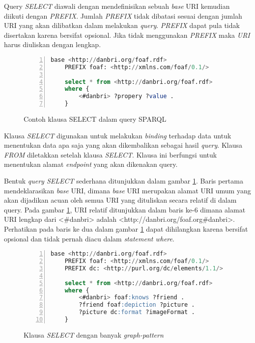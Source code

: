 Query \emph{SELECT} diawali dengan mendefinisikan sebuah \emph{base} URI kemudian diikuti dengan \emph{PREFIX}. Jumlah \emph{PREFIX} tidak dibatasi sesuai dengan jumlah URI yang akan dilibatkan dalam melakukan \emph{query}. \emph{PREFIX} dapat pula tidak disertakan karena bersifat opsional. Jika tidak menggunakan \emph{PREFIX} maka \emph{URI} harus diuliskan dengan lengkap.

\begin{figure}[hb]
	\centering
	\begin{lstlisting}[language=SQL, numbers=left]
	base <http://danbri.org/foaf.rdf>
	PREFIX foaf: <http://xmlns.com/foaf/0.1/>

	select * from <http://danbri.org/foaf.rdf>
	where {
		<#danbri> ?propery ?value .
	}\end{lstlisting}
	\caption{Contoh klausa SELECT dalam query SPARQL \citep{liyang_yu}}
	\label{fig:sparql_select_1}
\end{figure}

Klausa \emph{SELECT} digunakan untuk melakukan \emph{binding} terhadap data untuk menentukan data apa saja yang akan dikembalikan sebagai hasil \emph{query}. Klausa \emph{FROM} diletakkan setelah klausa \emph{SELECT}. Klausa ini berfungsi untuk menentukan alamat \emph{endpoint} yang akan dikenakan query.

Bentuk \emph{query SELECT} sederhana ditunjukkan dalam gambar \ref{fig:sparql_select_1}. Baris pertama mendeklarasikan \emph{base} URI, dimana \emph{base} URI merupakan alamat URI umum yang akan dijadikan acuan oleh semua URI yang dituliskan secara relatif di dalam query. Pada gambar \ref{fig:sparql_select_1}, URI relatif ditunjukkan dalam baris ke-6 dimana alamat URI lengkap dari <\#danbri> adalah <http://danbri.org/foaf.org\#danbri>. Perhatikan pada baris ke dua dalam gambar \ref{fig:sparql_select_1} dapat dihilangkan karena bersifat opsional dan tidak pernah diacu dalam \emph{statement where}.

\begin{figure}[hb]
	\centering
	\begin{lstlisting}[language=SQL,numbers=left]
	base <http://danbri.org/foaf.rdf>
	PREFIX foaf: <http://xmlns.com/foaf/0.1/>
	PREFIX dc: <http://purl.org/dc/elements/1.1/>

	select * from <http://danbri.org/foaf.rdf>
	where {
		<#danbri> foaf:knows ?friend .
		?friend foaf:depiction ?picture .
		?picture dc:format ?imageFormat .
	}\end{lstlisting}
	\caption{Klausa \emph{SELECT} dengan banyak \emph{graph-pattern} \citep{liyang_yu}}
	\label{fig:sparql_select_2}
\end{figure}

